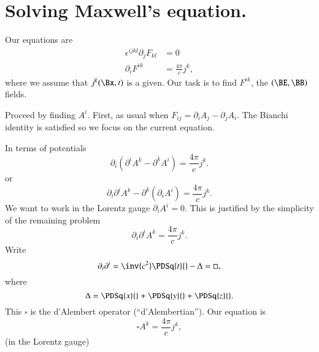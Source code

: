 %
%
\section{Solving Maxwell's equation.}

Our equations are
%
\begin{equation}\label{eqn:relativisticElectrodynamicsL17b:210}
\begin{aligned}
\epsilon^{i j k l} \partial_j F_{k l} &= 0 \\
\partial_i F^{i k} &= \frac{4 \pi}{c} j^k,
\end{aligned}
\end{equation}
%
where we assume that \(j^k(\Bx, t)\) is a given.  Our task is to find \(F^{i k}\), the \((\BE, \BB)\) fields.

Proceed by finding \(A^i\).  First, as usual when \(F_{i j} = \partial_i A_j - \partial_j A_i\).  The Bianchi identity is satisfied so we focus on the current equation.

In terms of potentials
%
\begin{equation}\label{eqn:relativisticElectrodynamicsL17b:230}
\partial_i (\partial^i A^k - \partial^k A^i) = \frac{ 4 \pi}{c} j^k.
\end{equation}
%
or
%
\begin{equation}\label{eqn:relativisticElectrodynamicsL17b:250}
\partial_i \partial^i A^k - \partial^k (\partial_i A^i) = \frac{ 4 \pi}{c} j^k.
\end{equation}
%
We want to work in the Lorentz gauge \(\partial_i A^i = 0\).  This is justified by the simplicity of the remaining problem
%
\begin{equation}\label{eqn:relativisticElectrodynamicsL17b:270}
\partial_i \partial^i A^k = \frac{4 \pi}{c} j^k.
\end{equation}
%
Write
%
\begin{equation}\label{eqn:relativisticElectrodynamicsL17b:290}
\partial_i \partial^i = \inv{c^2} \PDSq{t}{} - \Delta = \square,
\end{equation}
where
\begin{equation}\label{eqn:relativisticElectrodynamicsL17b:291}
\Delta = \PDSq{x}{} + \PDSq{y}{} + \PDSq{z}{}.
\end{equation}
This \(\square\) is the d'Alembert operator (``d'Alembertian'').
Our equation is
%
\begin{equation}\label{eqn:relativisticElectrodynamicsL17b:310}
\square A^k = \frac{4 \pi}{c} j^k,
\end{equation}
(in the Lorentz gauge)

